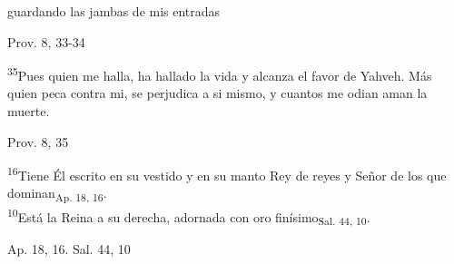 \documentclass[a4paper,11pt]{article}
\begin{document}
      guardando las jambas de mis entradas
      \begin{flushright}
        Prov. 8, 33-34
      \end{flushright}      
      \textsuperscript{35}Pues quien me halla, ha hallado la vida y alcanza el favor de Yahveh. Más quien peca contra mi, se perjudica a si mismo,
      y cuantos me odian aman la muerte.
      \begin{flushright}
        Prov. 8, 35
      \end{flushright}
      \textsuperscript{16}Tiene Él escrito en su vestido y en su manto Rey de reyes y Señor de los que dominan\textsubscript{Ap. 18, 16}.  \\
      \textsuperscript{10}Está la Reina a su derecha, adornada con oro finísimo\textsubscript{Sal. 44, 10}.
      \begin{flushright}
        Ap. 18, 16. Sal. 44, 10
      \end{flushright}
\end{document}
